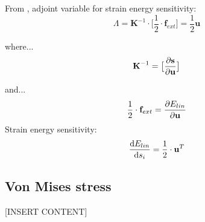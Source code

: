 From \cite{masching_dissertation}, adjoint variable for strain energy sensitivity:
\begin{equation}
\Lambda = \textbf{K}^{-1} \cdot \Big[\frac{1}{2}\cdot\textbf{f}_{ext} \Big] = \frac{1}{2}\textbf{u}
\end{equation}

where...
\begin{equation}
    \textbf{K}^{-1} = \big[ \pdv{\textbf{s}}{\textbf{u}}\big]
\end{equation}

and...
\begin{equation}
    \frac{1}{2}\cdot\textbf{f}_{ext} = \pdv{E_{lin}}{\textbf{u}}
\end{equation}
Strain energy sensitivity:
\begin{equation}
\dv{E_{lin}}{s_i} = \frac{1}{2}\cdot\textbf{u}^T
\label{}
\end{equation}
\subsection{Von Mises stress}
[INSERT CONTENT]
